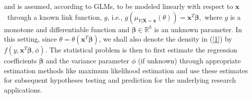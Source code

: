 \documentclass[a4paper]{article}%
\begin{document}
and is assumed, according to GLMs, to be modeled linearly with respect to
$\boldsymbol{x}$\ through a known link function, $g$, i.e.,%
$g(\mu_{Y|\boldsymbol{X=x}}(\theta))=\boldsymbol{x}^{T}\boldsymbol{\beta},$
where $g$ is a monotone and differentiable function and $\boldsymbol{\beta\in
}\mathbb{R}^{k}$ is an unknown parameter. In this setting, since
$\theta=\theta\left(  \boldsymbol{x}^{T}\boldsymbol{\beta}\right)  $, we shall
also denote the density in  (\ref{1}) by $f\left(  y,\boldsymbol{x}^{T}\boldsymbol{\beta}%
,\phi\right)$.
The statistical problem is then to first estimate the regression coefficients $\boldsymbol{\beta}$ 
and the variance parameter $\phi$ (if unknown) through appropriate estimation methods like maximum likelihood estimation 
and use these estimates for subsequent hypotheses testing and prediction for the underlying research applications.
\end{document}

